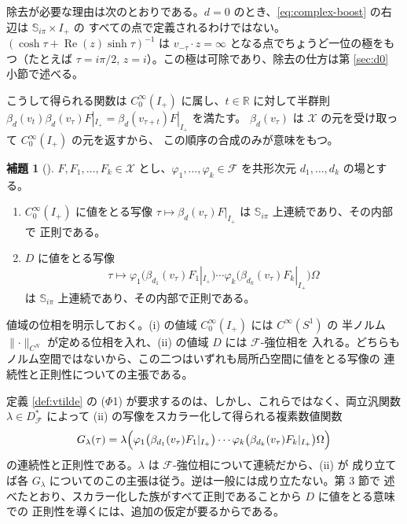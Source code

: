 \documentclass[11pt,a4paper]{article}
\newcommand{\Circ}{S^{1}}
\newcommand{\Fields}{\mathcal{F}}
\newcommand{\Xcl}{\mathcal{X}}
\newcommand{\Strip}{\mathbb{S}}
\newcommand{\Dom}{D}
\newcommand{\CN}[1]{\lVert #1 \rVert_{C^{N}}}
\newcommand{\Dstar}{\Dom^{*}_{\Fields}}
\theoremstyle{definition}
\newtheorem{lemma}[theorem]{補題}
\newcommand{\srcnum}[1]{\renewcommand{\thetheorem}{#1}}
\begin{document}
\noindent
除去が必要な理由は次のとおりである。$d = 0$ のとき、\eqref{eq:complex-boost} の右辺は $\Strip_{i\pi} \times I_+$ の
すべての点で定義されるわけではない。$(\cosh\tau + \operatorname{Re}(z)\sinh\tau)^{-1}$ は
$v_{-\tau}\cdot z = \infty$ となる点でちょうど一位の極をもつ（たとえば $\tau = i\pi/2$,
$z = i$）。この極は可除であり、除去の仕方は第 \ref{sec:d0} 小節で述べる。

こうして得られる関数は $C_0^\infty(I_+)$ に属し、$t \in \mathbb{R}$ に対して半群則
$\beta_d(v_t)\beta_d(v_\tau) F|_{I_+} = \beta_d(v_{\tau+t}) F|_{I_+}$ を満たす。
$\beta_d(v_\tau)$ は $\Xcl$ の元を受け取って $C_0^\infty(I_+)$ の元を返すから、
この順序の合成のみが意味をもつ。

\srcnum{3.6}
\begin{lemma}[\cite{T26}]
\label{lem:36}
$F, F_1, \dots, F_k \in \Xcl$ とし、$\varphi_1, \dots, \varphi_k \in \Fields$ を共形次元
$d_1, \dots, d_k$ の場とする。
\begin{enumerate}
  \item[(i)] $C_0^\infty(I_+)$ に値をとる写像
    $\tau \mapsto \beta_d(v_\tau)F|_{I_+}$ は $\Strip_{i\pi}$ 上連続であり、その内部で
    正則である。
  \item[(ii)] $\Dom$ に値をとる写像
    \[
      \tau \longmapsto \varphi_1\bigl(\beta_{d_1}(v_\tau)F_1|_{I_+}\bigr)
        \cdots \varphi_k\bigl(\beta_{d_k}(v_\tau)F_k|_{I_+}\bigr)\Omega
    \]
    は $\Strip_{i\pi}$ 上連続であり、その内部で正則である。
\end{enumerate}
\end{lemma}

\noindent
値域の位相を明示しておく。(i) の値域 $C_0^\infty(I_+)$ には $C^\infty(\Circ)$ の
半ノルム $\CN{\cdot}$ が定める位相を入れ、(ii) の値域 $\Dom$ には $\Fields$-強位相を
入れる。どちらもノルム空間ではないから、この二つはいずれも局所凸空間に値をとる写像の
連続性と正則性についての主張である。

定義 \ref{def:vtilde} の ($\Phi$1) が要求するのは、しかし、これらではなく、両立汎関数
$\lambda \in \Dstar$ によって (ii) の写像をスカラー化して得られる複素数値関数
\begin{equation}
  \label{eq:Glambda}
  G_\lambda(\tau) = \lambda\Bigl(\varphi_1\bigl(\beta_{d_1}(v_\tau)F_1|_{I_+}\bigr)
    \cdots \varphi_k\bigl(\beta_{d_k}(v_\tau)F_k|_{I_+}\bigr)\Omega\Bigr)
\end{equation}
の連続性と正則性である。$\lambda$ は $\Fields$-強位相について連続だから、(ii) が
成り立てば各 $G_\lambda$ についてのこの主張は従う。逆は一般には成り立たない。第 3 節で
述べたとおり、スカラー化した族がすべて正則であることから $\Dom$ に値をとる意味での
正則性を導くには、追加の仮定が要るからである。
\end{document}
